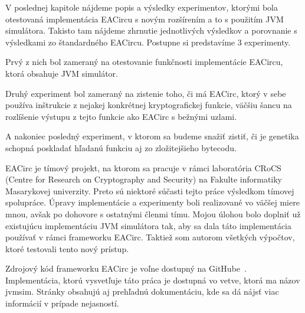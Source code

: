 V poslednej kapitole nájdeme popis a výsledky experimentov, ktorými bola otestovaná implementácia EACircu s novým rozšírením a to s použitím JVM simulátora. Takisto tam nájdeme zhrnutie jednotlivých výsledkov a porovnanie s výsledkami zo štandardného EACircu. Postupne si predstavíme 3 experimenty.

\begin{myItemize}
	\item Prvý z nich bol zameraný na otestovanie funkčnosti implementácie EACircu, ktorá obsahuje JVM simulátor.
	\item Druhý experiment bol zameraný na zistenie toho, či má EACirc, ktorý v sebe používa inštrukcie z nejakej konkrétnej kryptografickej funkcie, väčšiu šancu na rozlíšenie výstupu z tejto funkcie ako EACirc s bežnými uzlami.
	\item A nakoniec posledný experiment, v ktorom sa budeme snažiť zistiť, či je genetika schopná poskladať hľadanú funkciu aj zo zložitejšieho bytecodu.
\end{myItemize}

EACirc je tímový projekt, na ktorom sa pracuje v rámci laboratória CRoCS~\cite{crocs} (Centre for Research on Cryptography and Security) na Fakulte informatiky Masarykovej univerzity. Preto sú niektoré súčasti tejto práce výsledkom tímovej spolupráce. Úpravy implementácie a experimenty boli realizované vo väčšej miere mnou, avšak po dohovore s ostatnými členmi tímu. Mojou úlohou bolo doplniť už existujúcu implementáciu JVM simulátora tak, aby sa dala táto implementácia používať v rámci frameworku EACirc. Taktiež som autorom všetkých výpočtov, ktoré testovali tento nový prístup.

Zdrojový kód frameworku EACirc je voľne dostupný na GitHube~\parencite{eacirc-github}. Implementácia, ktorú vysvetľuje táto práca je dostupná vo vetve, ktorá ma názov jvmsim. Stránky obsahujú aj prehľadnú dokumentáciu, kde sa dá nájsť viac informácií v prípade nejasností. 
